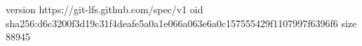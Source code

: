 version https://git-lfs.github.com/spec/v1
oid sha256:d6c3200f3d19c31f4deafe5a0a1e066a063e6a0c157555429f1107997f6396f6
size 88945
